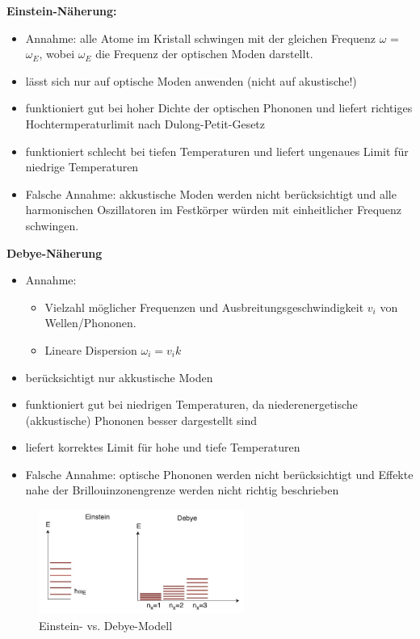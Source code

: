 \label{q:39}

\label{q:40}

\textbf{Einstein-Näherung:} 
\begin{itemize}
    \item Annahme: alle Atome im Kristall schwingen mit der gleichen Frequenz $\omega$ = $\omega_E$, wobei $\omega_E$ die Frequenz der optischen Moden darstellt. 
    \item lässt sich nur auf optische Moden anwenden (nicht auf akustische!)
    \item funktioniert gut bei hoher Dichte der optischen Phononen und liefert richtiges 
    Hochtermperaturlimit nach Dulong-Petit-Gesetz
    \item funktioniert schlecht bei tiefen Temperaturen und liefert ungenaues Limit für niedrige Temperaturen
    \item Falsche Annahme: akkustische Moden werden nicht berücksichtigt und alle harmonischen Oszillatoren im Festkörper würden mit einheitlicher Frequenz schwingen.
\end{itemize}

\textbf{Debye-Näherung} 
\begin{itemize}
    \item Annahme: 
        \begin{itemize}
            \item Vielzahl möglicher Frequenzen und Ausbreitungsgeschwindigkeit $v_i$ von Wellen/Phononen. 
            \item Lineare Dispersion $\omega_i=v_ik$ 
        \end{itemize}
    \item berücksichtigt nur akkustische Moden
    \item funktioniert gut bei niedrigen Temperaturen, da niederenergetische (akkustische) Phononen besser dargestellt sind 
    \item liefert korrektes Limit für hohe und tiefe Temperaturen
    \item Falsche Annahme: optische Phononen werden nicht berücksichtigt und Effekte nahe der Brillouinzonengrenze werden nicht richtig beschrieben
\end{itemize}

\begin{figure}[H]
 \centering
 \includegraphics[width=0.6\textwidth]{resources/15-06-2015/Einstein_Debye.jpeg}
 \caption{Einstein- vs. Debye-Modell}
\end{figure}
\newpage